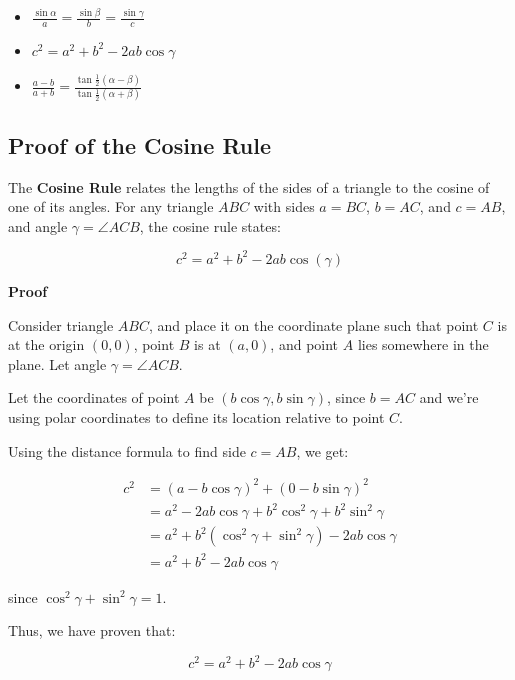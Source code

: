 \begin{itemize}[label =\(-\)]
	\item \(\frac{\sin \alpha}{a} = \frac{\sin \beta}{b} = \frac{\sin \gamma}{c}\)
	\item \(c^2 = a^2 + b^2 - 2ab \cos \gamma\)
	\item \(\frac{a - b}{a + b} = \frac{\tan \frac{1}{2}(\alpha - \beta)}{\tan \frac{1}{2} (\alpha + \beta)}\)
\end{itemize}

\subsection{Proof of the Cosine Rule}

The \textbf{Cosine Rule} relates the lengths of the sides of a triangle to the cosine of one of its angles. For any triangle \( ABC \) with sides \( a = BC \), \( b = AC \), and \( c = AB \), and angle \( \gamma = \angle ACB \), the cosine rule states:

\[
c^2 = a^2 + b^2 - 2ab\cos(\gamma)
\]

\textbf{Proof}

Consider triangle \( ABC \), and place it on the coordinate plane such that point \( C \) is at the origin \( (0,0) \), point \( B \) is at \( (a,0) \), and point \( A \) lies somewhere in the plane. Let angle \( \gamma = \angle ACB \).

Let the coordinates of point \( A \) be \( (b\cos\gamma, b\sin\gamma) \), since \( b = AC \) and we’re using polar coordinates to define its location relative to point \( C \).

Using the distance formula to find side \( c = AB \), we get:

\begin{align*}
c^2 &= (a - b\cos\gamma)^2 + (0 - b\sin\gamma)^2 \\
&= a^2 - 2ab\cos\gamma + b^2\cos^2\gamma + b^2\sin^2\gamma \\
&= a^2 + b^2(\cos^2\gamma + \sin^2\gamma) - 2ab\cos\gamma \\
&= a^2 + b^2 - 2ab\cos\gamma
\end{align*}

since \( \cos^2\gamma + \sin^2\gamma = 1 \).

Thus, we have proven that:

\[
c^2 = a^2 + b^2 - 2ab\cos\gamma
\]

\QED
\newpage